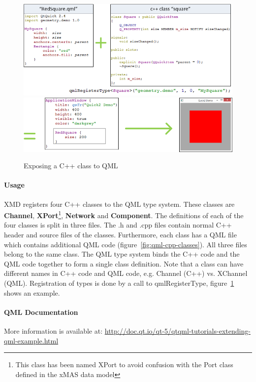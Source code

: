 \begin{figure}
    \includegraphics[width=\textwidth]{qml1}
    \includegraphics[width=\textwidth]{qml2}
    \caption{Exposing a C++ class to QML}
    \label{fig:register-qml}
\end{figure}

\paragraph{Usage}XMD registers four C++ classes to the QML type system. These classes
are \textbf{Channel}, \textbf{XPort}\footnote{This class has been named XPort to
avoid confusion with the Port class defined in the xMAS data model}, \textbf{Network}
and \textbf{Component}. The definitions of each of the four classes is split in
three files. The .h and .cpp files contain normal C++ header and source files of
the classes. Furthermore, each class has a QML file which contains additional
QML code (figure~\ref{fig:qml-cpp-classes}). All three files belong to the same
class. The QML type system binds the C++ code and the QML code together to form a
single class definition. Note that a class can have different names in C++ code
and QML code, e.g. Channel (C++) vs. XChannel (QML). Registration of types is
done by a call to qmlRegisterType, figure~\ref{fig:register-qml} shows an example.

\paragraph{QML Documentation}
More information is available at:
\url{http://doc.qt.io/qt-5/qtqml-tutorials-extending-qml-example.html}


